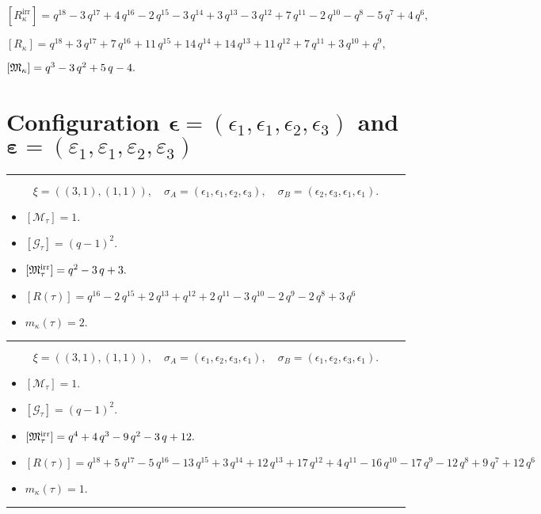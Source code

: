 \documentclass[10pt,a4paper]{amsart}
\begin{document}
${[R_{\kappa}^{\textrm{irr}}]} = q^{18} - 3 \, q^{17} + 4 \, q^{16} - 2 \, q^{15} - 3 \, q^{14} + 3 \, q^{13} - 3 \, q^{12} + 7 \, q^{11} - 2 \, q^{10} - q^{8} - 5 \, q^{7} + 4 \, q^{6} ,$

${[R_{\kappa}]} = q^{18} + 3 \, q^{17} + 7 \, q^{16} + 11 \, q^{15} + 14 \, q^{14} + 14 \, q^{13} + 11 \, q^{12} + 7 \, q^{11} + 3 \, q^{10} + q^{9} ,$

${[{\frak M}_{\kappa}]} = q^{3} - 3 \, q^{2} + 5 \, q - 4 .$

\newpage{}

\section{Configuration $\bm{\epsilon} = (\epsilon_1,\epsilon_1,\epsilon_2,\epsilon_3)$ and $\bm{\varepsilon} =(\varepsilon_1,\varepsilon_1,\varepsilon_2,\varepsilon_3)$}
\noindent\rule{8cm}{0.4pt}

$$\xi = ({(3, 1), (1, 1)}),\quad \sigma_A = ({{\epsilon_1, \epsilon_1, \epsilon_2}, {\epsilon_3}}),\quad \sigma_B = ({{\epsilon_2, \epsilon_3, \epsilon_1}, {\epsilon_1}}).$$

\begin{itemize}
 \item $[\mathcal{M}_{\tau}] = 1 .$

 \item $[\mathcal{G}_{\tau}] = {\left(q - 1\right)}^{2} .$

 \item $[{\frak M}_{\tau}^{\textrm{irr}}] = q^{2} - 3 \, q + 3 .$

 \item $[R(\tau)] = q^{16} - 2 \, q^{15} + 2 \, q^{13} + q^{12} + 2 \, q^{11} - 3 \, q^{10} - 2 \, q^{9} - 2 \, q^{8} + 3 \, q^{6} $

 \item $m_{\kappa}(\tau) = 2 .$

 \end{itemize}
\noindent\rule{8cm}{0.4pt}

$$\xi = ({(3, 1), (1, 1)}),\quad \sigma_A = ({{\epsilon_1, \epsilon_2, \epsilon_3}, {\epsilon_1}}),\quad \sigma_B = ({{\epsilon_1, \epsilon_2, \epsilon_3}, {\epsilon_1}}).$$

\begin{itemize}
 \item $[\mathcal{M}_{\tau}] = 1 .$

 \item $[\mathcal{G}_{\tau}] = {\left(q - 1\right)}^{2} .$

 \item $[{\frak M}_{\tau}^{\textrm{irr}}] = q^{4} + 4 \, q^{3} - 9 \, q^{2} - 3 \, q + 12 .$

 \item $[R(\tau)] = q^{18} + 5 \, q^{17} - 5 \, q^{16} - 13 \, q^{15} + 3 \, q^{14} + 12 \, q^{13} + 17 \, q^{12} + 4 \, q^{11} - 16 \, q^{10} - 17 \, q^{9} - 12 \, q^{8} + 9 \, q^{7} + 12 \, q^{6} $

 \item $m_{\kappa}(\tau) = 1 .$

 \end{itemize}
\noindent\rule{8cm}{0.4pt}
\end{document}

